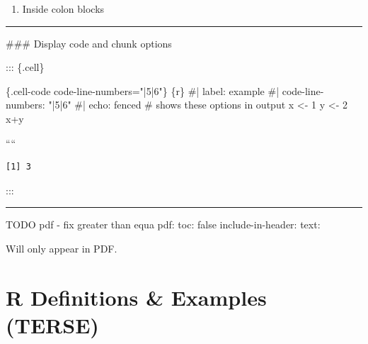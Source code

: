 \documentclass[
]{report}
\newenvironment{Shaded}{\begin{snugshade}}{\end{snugshade}}
\newcommand{\DecValTok}[1]{\textcolor[rgb]{0.68,0.00,0.00}{#1}}
\newcommand{\ErrorTok}[1]{\textcolor[rgb]{0.68,0.00,0.00}{#1}}
\newcommand{\FunctionTok}[1]{\textcolor[rgb]{0.28,0.35,0.67}{#1}}
\newcommand{\InformationTok}[1]{\textcolor[rgb]{0.37,0.37,0.37}{#1}}
\newcommand{\NormalTok}[1]{\textcolor[rgb]{0.00,0.23,0.31}{#1}}
\newcommand{\OperatorTok}[1]{\textcolor[rgb]{0.37,0.37,0.37}{#1}}
\newcommand{\PreprocessorTok}[1]{\textcolor[rgb]{0.68,0.00,0.00}{#1}}
\providecommand{\tightlist}{%
  \setlength{\itemsep}{0pt}\setlength{\parskip}{0pt}}
\begin{document}
\begin{enumerate}
\def\labelenumi{\arabic{enumi}.}
\setcounter{enumi}{3}
\tightlist
\item
  Inside colon blocks
\end{enumerate}

\begin{center}\rule{0.5\linewidth}{0.5pt}\end{center}

\begin{Shaded}
\begin{Highlighting}[]



\FunctionTok{\#\#\# Display code and chunk options}


\NormalTok{::: \{.cell\}}

\InformationTok{\textasciigrave{}\textasciigrave{}\textasciigrave{}\textasciigrave{}\{.cell{-}code  code{-}line{-}numbers="|5|6"\}}
\NormalTok{\textasciigrave{}\textasciigrave{}\textasciigrave{}}\OperatorTok{\{}\NormalTok{r}\OperatorTok{\}}
\PreprocessorTok{\#}\ErrorTok{| label: example}
\PreprocessorTok{\#}\ErrorTok{| code{-}line{-}numbers: "|5|6"}
\PreprocessorTok{\#}\ErrorTok{| echo: fenced \# shows these options in output}
\NormalTok{x  }\OperatorTok{\textless{}{-}} \DecValTok{1}
\NormalTok{y  }\OperatorTok{\textless{}{-}} \DecValTok{2}
\NormalTok{x}\OperatorTok{+}\NormalTok{y}
\end{Highlighting}
\end{Shaded}

````

\begin{verbatim}
[1] 3
\end{verbatim}

:::

\begin{center}\rule{0.5\linewidth}{0.5pt}\end{center}

TODO pdf - fix greater than equa pdf: toc: false include-in-header:
text: \textbar{}

\usepackage[top=.5in, bottom=.5in, left=.7in, right=.5in]{geometry}
        \usepackage{amsmath,amssymb,amstext,amsfonts}
        \usepackage{lipsum}

Will only appear in PDF. \renewcommand{\familydefault}{\sfdefault}

\section{R Definitions \& Examples   (TERSE)}
\end{document}
